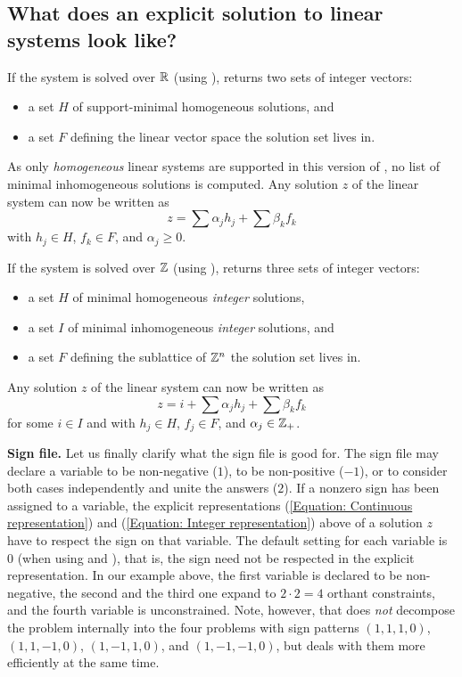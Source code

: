 \subsection{What does an explicit solution to linear systems look like?}

If the system is solved over $\mathbb R$ (using ),
\FourTiTwo{} returns two sets of integer vectors:
\begin{itemize}
\item a set $H$ of support-minimal homogeneous solutions, and
\item a set $F$ defining the linear vector space the solution set
lives in.
\end{itemize}
As only \emph{homogeneous} linear systems are supported in this
version of \FourTiTwo, no list of minimal inhomogeneous solutions is
computed. Any solution $z$ of the linear system can now be written
as
\begin{equation}\label{Equation: Continuous representation}
z=\sum \alpha_j h_j+ \sum \beta_k f_k
\end{equation}
with $h_j\in H$, $f_k\in F$, and $\alpha_j\geq 0$.

If the system is solved over $\mathbb Z$ (using ),
\FourTiTwo{} returns three sets of integer vectors:
\begin{itemize}
\item a set $H$ of minimal homogeneous \emph{integer} solutions,
\item a set $I$ of minimal inhomogeneous \emph{integer}
solutions, and
\item a set $F$ defining the sublattice of $\mathbb Z^n$ the solution set
lives in.
\end{itemize}
Any solution $z$ of the linear system can now be written as
\begin{equation}\label{Equation: Integer representation}
z=i+ \sum \alpha_j h_j+\sum \beta_k f_k
\end{equation}
for some $i\in I$ and with $h_j\in H$, $f_j\in F$, and
$\alpha_j\in\mathbb Z_+$.

{\bf Sign file.} Let us finally clarify what the sign file
 is good for. The sign file may declare a
variable to be non-negative ($1$), to be non-positive ($-1$), or to
consider both cases independently and unite the answers ($2$). If a
nonzero sign has been assigned to a variable, the explicit
representations (\ref{Equation: Continuous representation}) and
(\ref{Equation: Integer representation}) above of a solution $z$
have to respect the sign on that variable. The default setting for
each variable is $0$ (when using  and ),
that is, the sign need not be respected in the explicit
representation. In our example above, the first variable is declared
to be non-negative, the second and the third one expand to $2\cdot
2=4$ orthant constraints, and the fourth variable is unconstrained.
Note, however, that \FourTiTwo{} does \emph{not} decompose the
problem internally into the four problems with sign patterns
$(1,1,1,0)$, $(1,1,-1,0)$, $(1,-1,1,0)$, and $(1,-1,-1,0)$, but
deals with them more efficiently at the same time.


